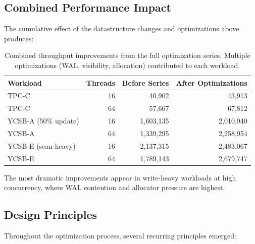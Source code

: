 \documentclass[11pt]{article}
\begin{document}
\subsection{Combined Performance Impact}

The cumulative effect of the datastructure changes and optimizations above produces:

\begin{table}[h]
\centering
\small
\begin{tabular}{lrrr}
\toprule
\textbf{Workload} & \textbf{Threads} & \textbf{Before Series} & \textbf{After Optimizations} \\
\midrule
TPC-C & 16 & 40,902 & 43,913 \\
TPC-C & 64 & 57,667 & 67,812 \\
YCSB-A (50\% update) & 16 & 1,603,135 & 2,010,940 \\
YCSB-A & 64 & 1,339,295 & 2,258,954 \\
YCSB-E (scan-heavy) & 16 & 2,137,315 & 2,483,067 \\
YCSB-E & 64 & 1,789,143 & 2,679,747 \\
\bottomrule
\end{tabular}
\caption{Combined throughput improvements from the full optimization series. Multiple
optimizations (WAL, visibility, allocation) contributed to each workload.}
\label{tab:combined_impact}
\end{table}

The most dramatic improvements appear in write-heavy workloads at high concurrency,
where WAL contention and allocator pressure are highest.

\subsection{Design Principles}

Throughout the optimization process, several recurring principles emerged:
\end{document}
